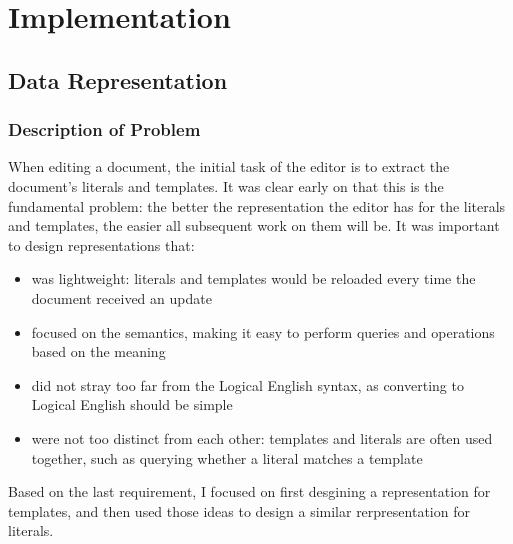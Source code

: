 \documentclass[../main.tex]{subfiles}
\begin{document}
\chapter{Implementation}
\section{Data Representation}
\subsection{Description of Problem}
When editing a document, the initial task of the editor is to extract the document's literals and templates. It was clear early on that this is the fundamental problem: the better the representation the editor has for the literals and templates, the easier all subsequent work on them will be. It was important to design representations that:
\begin{itemize}
    \item was lightweight: literals and templates would be reloaded every time the document received an update
    \item focused on the semantics, making it easy to perform queries and operations based on the meaning
    \item did not stray too far from the Logical English syntax, as converting to Logical English should be simple
    \item were not too distinct from each other: templates and literals are often used together, such as querying whether a literal matches a template
\end{itemize}
Based on the last requirement, I focused on first desgining a representation for templates, and then used those ideas to design a similar rerpresentation for literals. 
\end{document}
